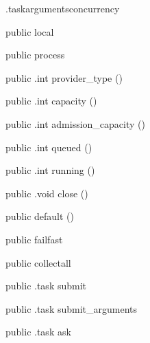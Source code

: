 \begin{CrexxClass}{.taskarguments}{concurrency}

  \begin{Hierarchy}
  \end{Hierarchy}

  \begin{Members}

    \Factory
      {public}
      {local}
      {}

    \Factory
      {public}
      {process}
      {}

    \Method
      {public}
      {.int}
      {provider\_type}
      {()}

    \Method
      {public}
      {.int}
      {capacity}
      {()}

    \Method
      {public}
      {.int}
      {admission\_capacity}
      {()}

    \Method
      {public}
      {.int}
      {queued}
      {()}

    \Method
      {public}
      {.int}
      {running}
      {()}

    \Method
      {public}
      {.void}
      {close}
      {()}

    \Factory
      {public}
      {default}
      {()}

    \Factory
      {public}
      {failfast}
      {}

    \Factory
      {public}
      {collectall}
      {}

    \Method
      {public}
      {.task}
      {submit}
      {}

    \Method
      {public}
      {.task}
      {submit\_arguments}
      {}

    \Method
      {public}
      {.task}
      {ask}
      {}


\end{Members}
\end{CrexxClass}
